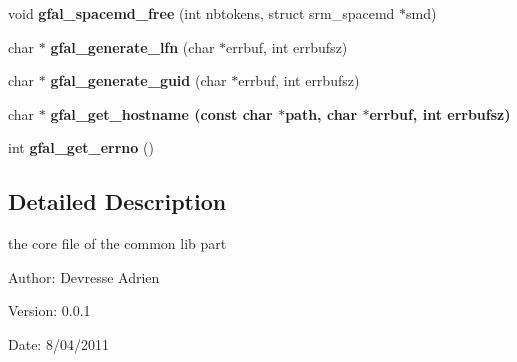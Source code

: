 \begin{CompactItemize}
\item 
void \textbf{gfal\_\-spacemd\_\-free} (int nbtokens, struct srm\_\-spacemd $\ast$smd)\label{group__internal__group_gb22308fb1cfbade81dddfcf4bedf86da}

\item 
char $\ast$ \textbf{gfal\_\-generate\_\-lfn} (char $\ast$errbuf, int errbufsz)\label{group__internal__group_gcd48b57bf9659be5204319918c6f9d20}

\item 
char $\ast$ \textbf{gfal\_\-generate\_\-guid} (char $\ast$errbuf, int errbufsz)\label{group__internal__group_g8311ede197e204e57029165fbc3898d6}

\item 
char $\ast$ \bf{gfal\_\-get\_\-hostname} (const char $\ast$path, char $\ast$errbuf, int errbufsz)
\item 
int \textbf{gfal\_\-get\_\-errno} ()\label{gfal__common_8c_4f4c3163c72535da9dd42484905b1c7c}

\end{CompactItemize}


\subsection{Detailed Description}
the core file of the common lib part 

\begin{Desc}
\item[Author:]Devresse Adrien \end{Desc}
\begin{Desc}
\item[Version:]0.0.1 \end{Desc}
\begin{Desc}
\item[Date:]8/04/2011 \end{Desc}
